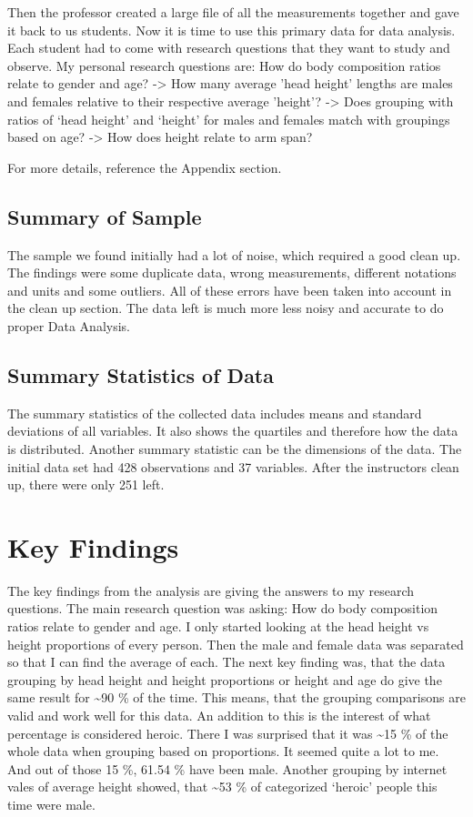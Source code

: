 \documentclass[]{article}
\begin{document}
Then the professor created a large file of all the measurements together
and gave it back to us students. Now it is time to use this primary data
for data analysis. Each student had to come with research questions that
they want to study and observe. My personal research questions are: How
do body composition ratios relate to gender and age? -\textgreater{} How
many average 'head height' lengths are males and females relative to
their respective average 'height'? -\textgreater{} Does grouping with
ratios of `head height' and `height' for males and females match with
groupings based on age? -\textgreater{} How does height relate to arm
span?

For more details, reference the Appendix section.

\subsection{Summary of Sample}
\label{sec:data-sample}

The sample we found initially had a lot of noise, which required a good
clean up. The findings were some duplicate data, wrong measurements,
different notations and units and some outliers. All of these errors
have been taken into account in the clean up section. The data left is
much more less noisy and accurate to do proper Data Analysis.

\subsection{Summary Statistics of Data}
\label{sec:data-summary}

The summary statistics of the collected data includes means and standard
deviations of all variables. It also shows the quartiles and therefore
how the data is distributed. Another summary statistic can be the
dimensions of the data. The initial data set had 428 observations and 37
variables. After the instructors clean up, there were only 251 left.

\section{Key Findings}
\label{sec:findings}

The key findings from the analysis are giving the answers to my research
questions. The main research question was asking: How do body
composition ratios relate to gender and age. I only started looking at
the head height vs height proportions of every person. Then the male and
female data was separated so that I can find the average of each. The
next key finding was, that the data grouping by head height and height
proportions or height and age do give the same result for
\textasciitilde90 \% of the time. This means, that the grouping
comparisons are valid and work well for this data. An addition to this
is the interest of what percentage is considered heroic. There I was
surprised that it was \textasciitilde15 \% of the whole data when
grouping based on proportions. It seemed quite a lot to me. And out of
those 15 \%, 61.54 \% have been male. Another grouping by internet vales
of average height showed, that \textasciitilde53 \% of categorized
`heroic' people this time were male.
\end{document}

